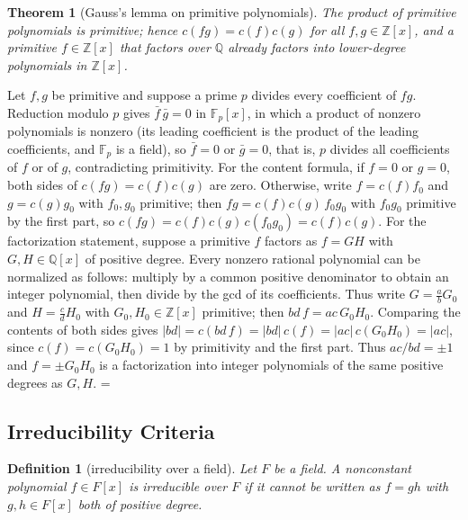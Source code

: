 \documentclass[11pt]{article}
\makeatletter
\let\nt@closedisplay\]
\def\nt@guardedclose{\@ifnextchar\par{\nt@closeafterpar}{\@ifnextchar\end{\postdisplaypenalty\@M\nt@closedisplay}{\nt@closedisplay}}}
\def\nt@closeafterpar\par{\@ifnextchar\par{\nt@closeafterpar}{\@ifnextchar\end{\postdisplaypenalty\@M\nt@closedisplay\par}{\nt@closedisplay\par}}}
\renewenvironment{proof}[1][\proofname]{\par
  \pushQED{\qed}\normalfont\topsep\medskipamount\edef\nt@afterproof{\@endparpenalty=\the\@endparpenalty\relax}\@beginparpenalty\@M\@endparpenalty\@M\let\]\nt@guardedclose\trivlist\item[]\textit{#1\@addpunct{.}} \ignorespaces}{\ifvmode\addpenalty\@M\fi\popQED\nt@afterproof\endtrivlist\@endpefalse}
\theoremstyle{ntstyle}
\newtheorem{theorem}{Theorem}[subsection]
\newtheorem{definition}{Definition}[subsection]
\makeatother
\begin{document}
\begin{theorem}[Gauss's lemma on primitive polynomials]\label{thm:11.2.1}\label{thm:gauss-lemma-on-primitive-polynomials}
  The product of
  primitive polynomials is primitive; hence $c(fg)=c(f)c(g)$ for all $f,g\in\mathbb{Z}[x]$, and a
  primitive $f\in\mathbb{Z}[x]$ that factors over $\mathbb{Q}$ already
  factors into lower-degree polynomials in $\mathbb{Z}[x]$.

\end{theorem}

\begin{proof} Let $f,g$ be primitive and suppose a prime
  $p$ divides every coefficient of $fg$. Reduction modulo $p$ gives $\bar f\,\bar g = 0$ in $\mathbb{F}_p[x]$, in
  which a product of nonzero polynomials is
  nonzero (its leading coefficient is the product of the leading
  coefficients, and $\mathbb{F}_p$ is a field), so $\bar f = 0$ or
  $\bar g = 0$, that is, $p$ divides all coefficients of $f$ or of $g$,
  contradicting primitivity. For the content formula, if $f=0$ or $g=0$,
  both sides of $c(fg)=c(f)c(g)$ are zero. Otherwise, write $f = c(f)f_0$
  and $g = c(g)g_0$ with $f_0, g_0$
  primitive; then $fg = c(f)c(g)\,f_0g_0$ with $f_0g_0$ primitive by the
  first part, so $c(fg) = c(f)c(g)\,c(f_0g_0) = c(f)c(g)$. For the
  factorization statement, suppose a
  primitive $f$ factors as $f=GH$ with $G,H\in\mathbb{Q}[x]$ of
  positive degree. Every nonzero rational polynomial can be normalized as follows: multiply by a common positive
  denominator to obtain an integer polynomial, then divide by the gcd of its coefficients. Thus write
  $G=\tfrac{a}{b}G_0$ and $H=\tfrac{c}{d}H_0$ with $G_0,H_0\in\mathbb{Z}[x]$ primitive; then $bd\,f=ac\,G_0H_0$.
  Comparing the contents of both sides gives
  $|bd|=c(bd\,f)=|bd|\,c(f)=|ac|\,c(G_0H_0)=|ac|$, since
  $c(f)=c(G_0H_0)=1$ by primitivity and the first part. Thus $ac/bd=\pm1$ and $f=\pm G_0H_0$ is a factorization
  into integer polynomials of the same
  positive degrees as $G,H$.
\end{proof}
\subsection{Irreducibility Criteria}

\begin{definition}[irreducibility over a field]\label{def:11.3.1}\label{def:irreducibility-over-a-field}
  Let $F$ be a field. A nonconstant polynomial $f\in F[x]$ is
  irreducible over $F$ if it cannot be written as $f=gh$ with
  $g,h\in F[x]$ both of positive degree.

\end{definition}
\end{document}
